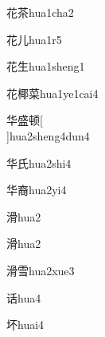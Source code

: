 \begin{verbete}[7;9]{花茶}{hua1cha2}
\end{verbete}

\begin{verbete}[7;2]{花儿}{hua1r5}
\end{verbete}

\begin{verbete}[7;5]{花生}{hua1sheng1}
\end{verbete}

\begin{verbete}[7;12;11]{花椰菜}{hua1ye1cai4}
\end{verbete}

\begin{verbete*}[6;11;10]{华盛顿}[\\]{hua2sheng4dun4}
\end{verbete*}

\begin{verbete}[6;4]{华氏}{hua2shi4}
\end{verbete}

\begin{verbete}[6;13]{华裔}{hua2yi4}
\end{verbete}

\begin{verbete}[12]{滑}{hua2}
\end{verbete}
\begin{verbete*}[12]{滑}{hua2}
\end{verbete*}

\begin{verbete}[12;11]{滑雪}{hua2xue3}
\end{verbete}

\begin{verbete}[8]{话}{hua4}
\end{verbete}

\begin{verbete}[7]{坏}{huai4}
\end{verbete}

